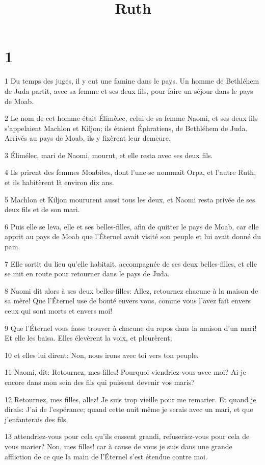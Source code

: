 

\title{Ruth}


\chapter{1}

\par 1 Du temps des juges, il y eut une famine dans le pays. Un homme de Bethléhem de Juda partit, avec sa femme et ses deux fils, pour faire un séjour dans le pays de Moab.
\par 2 Le nom de cet homme était Élimélec, celui de sa femme Naomi, et ses deux fils s'appelaient Machlon et Kiljon; ils étaient Éphratiens, de Bethléhem de Juda. Arrivés au pays de Moab, ils y fixèrent leur demeure.
\par 3 Élimélec, mari de Naomi, mourut, et elle resta avec ses deux fils.
\par 4 Ils prirent des femmes Moabites, dont l'une se nommait Orpa, et l'autre Ruth, et ils habitèrent là environ dix ans.
\par 5 Machlon et Kiljon moururent aussi tous les deux, et Naomi resta privée de ses deux fils et de son mari.
\par 6 Puis elle se leva, elle et ses belles-filles, afin de quitter le pays de Moab, car elle apprit au pays de Moab que l'Éternel avait visité son peuple et lui avait donné du pain.
\par 7 Elle sortit du lieu qu'elle habitait, accompagnée de ses deux belles-filles, et elle se mit en route pour retourner dans le pays de Juda.
\par 8 Naomi dit alors à ses deux belles-filles: Allez, retournez chacune à la maison de sa mère! Que l'Éternel use de bonté envers vous, comme vous l'avez fait envers ceux qui sont morts et envers moi!
\par 9 Que l'Éternel vous fasse trouver à chacune du repos dans la maison d'un mari! Et elle les baisa. Elles élevèrent la voix, et pleurèrent;
\par 10 et elles lui dirent: Non, nous irons avec toi vers ton peuple.
\par 11 Naomi, dit: Retournez, mes filles! Pourquoi viendriez-vous avec moi? Ai-je encore dans mon sein des fils qui puissent devenir vos maris?
\par 12 Retournez, mes filles, allez! Je suis trop vieille pour me remarier. Et quand je dirais: J'ai de l'espérance; quand cette nuit même je serais avec un mari, et que j'enfanterais des fils,
\par 13 attendriez-vous pour cela qu'ils eussent grandi, refuseriez-vous pour cela de vous marier? Non, mes filles! car à cause de vous je suis dans une grande affliction de ce que la main de l'Éternel s'est étendue contre moi.

